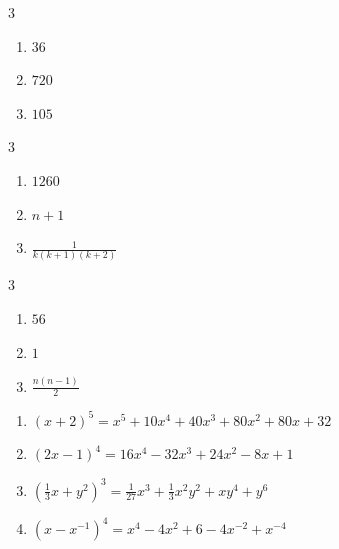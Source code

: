 \documentclass{ximera}
\begin{document}
	\author{Stitz-Zeager}



\begin{multicols}{3}
\begin{enumerate}

\item  $36$

\item  $720$

\item  $105$

\setcounter{HW}{\value{enumi}}
\end{enumerate}
\end{multicols}

\begin{multicols}{3}
\begin{enumerate}
\setcounter{enumi}{\value{HW}}

\item  $1260$

\item  $n+1$

\item  $\frac{1}{k(k+1)(k+2)}$

\setcounter{HW}{\value{enumi}}
\end{enumerate}
\end{multicols}

\begin{multicols}{3}
\begin{enumerate}
\setcounter{enumi}{\value{HW}}

\item  $56$

\item  $1$

\item  $\frac{n(n-1)}{2}$

\setcounter{HW}{\value{enumi}}
\end{enumerate}
\end{multicols}


\begin{enumerate}
\setcounter{enumi}{\value{HW}}

\item  $(x+2)^5 = x^5+10x^4+40x^3+80x^2+80x+32$

\item  $(2x-1)^4 = 16x^4-32x^3+24x^2-8x+1$

\item  $\left(\frac{1}{3} x +  y^2\right)^3 = \frac{1}{27} x^3+\frac{1}{3}x^2y^2+xy^4+y^6$

\item  $\left(x - x^{-1} \right)^{4} = x^4-4x^2+6-4x^{-2}+x^{-4}$

\setcounter{HW}{\value{enumi}}
\end{enumerate}
\end{document}
